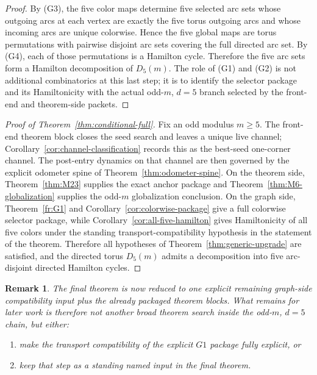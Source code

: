 \documentclass[11pt]{article}
\newtheorem{remark}[theorem]{Remark}
\begin{document}
\begin{proof}
By (G3), the five color maps determine five selected arc sets whose outgoing
arcs at each vertex are exactly the five torus outgoing arcs and whose incoming
arcs are unique colorwise.  Hence the five global maps are torus permutations
with pairwise disjoint arc sets covering the full directed arc set.
By (G4), each of those permutations is a Hamilton cycle.
Therefore the five arc sets form a Hamilton decomposition of $D_5(m)$.
The role of (G1) and (G2) is not additional combinatorics at this last step;
it is to identify the selector package and its Hamiltonicity with the actual
odd-$m$, $d=5$ branch selected by the front-end and theorem-side packets.
\end{proof}

\begin{proof}[Proof of Theorem~\ref{thm:conditional-full}]
Fix an odd modulus $m\ge 5$.
The front-end theorem block closes the seed search and leaves a unique live
channel; Corollary~\ref{cor:channel-classification} records this as the
best-seed one-corner channel.
The post-entry dynamics on that channel are then governed by the explicit
odometer spine of Theorem~\ref{thm:odometer-spine}.
On the theorem side, Theorem~\ref{thm:M23} supplies the exact anchor package
and Theorem~\ref{thm:M6-globalization} supplies the odd-$m$ globalization
conclusion.
On the graph side, Theorem~\ref{fr:G1} and
Corollary~\ref{cor:colorwise-package} give a full colorwise selector package,
while Corollary~\ref{cor:all-five-hamilton} gives Hamiltonicity of all five
colors under the standing transport-compatibility hypothesis in the statement
of the theorem.
Therefore all hypotheses of Theorem~\ref{thm:generic-upgrade} are satisfied,
and the directed torus $D_5(m)$ admits a decomposition into five arc-disjoint
directed Hamilton cycles.
\end{proof}

\begin{remark}
The final theorem is now reduced to one explicit remaining graph-side
compatibility input plus the already packaged theorem blocks.
What remains for later work is therefore not another broad theorem search inside
the odd-$m$, $d=5$ chain, but either:
\begin{enumerate}[label=\textup{(\arabic*)},leftmargin=2.8em]
\item make the transport compatibility of the explicit \(G1\) package fully
      explicit, or
\item keep that step as a standing named input in the final theorem.
\end{enumerate}
\end{remark}
\end{document}
